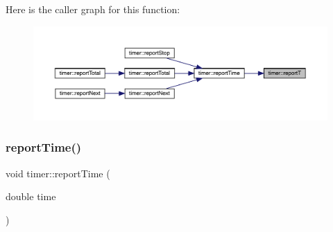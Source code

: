Here is the caller graph for this function\+:\nopagebreak
\begin{figure}[H]
\begin{center}
\leavevmode
\includegraphics[width=350pt]{structtimer_a18f1ffc85c804ee50a0e835c07abe5b2_icgraph}
\end{center}
\end{figure}
\mbox{\label{structtimer_adcf87a7455e8e9ca9abb133427bebb39}} 
\subsubsection{\texorpdfstring{reportTime()}{reportTime()}}
{\footnotesize\ttfamily void timer\+::report\+Time (\begin{DoxyParamCaption}\item[{double}]{time }\end{DoxyParamCaption})\hspace{0.3cm}{\ttfamily [inline]}}

